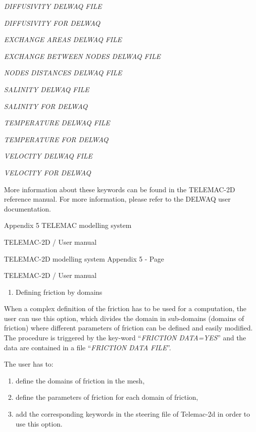  \textit{DIFFUSIVITY DELWAQ FILE}

 \textit{DIFFUSIVITY FOR DELWAQ}

 \textit{EXCHANGE AREAS DELWAQ FILE}

 \textit{EXCHANGE BETWEEN NODES DELWAQ FILE}

 \textit{NODES DISTANCES DELWAQ FILE}

 \textit{SALINITY DELWAQ FILE}

 \textit{SALINITY FOR DELWAQ}

 \textit{TEMPERATURE DELWAQ FILE}

 \textit{TEMPERATURE FOR DELWAQ}

 \textit{VELOCITY DELWAQ FILE}

 \textit{VELOCITY FOR DELWAQ}

 More information about these keywords can be found in the TELEMAC-2D reference manual. For more information, please refer to the DELWAQ user documentation.











 Appendix 5 TELEMAC modelling system

 TELEMAC-2D / User manual



 TELEMAC-2D modelling system Appendix 5 - Page

 TELEMAC-2D / User manual





\begin{enumerate}
\item   Defining friction by domains
\end{enumerate}

 When a complex definition of the friction has to be used for a computation, the user can use this option, which divides the domain in sub-domains (domains of friction) where different parameters of friction can be defined and easily modified. The procedure is triggered by the key-word ``\textit{FRICTION DATA=YES}'' and the data are contained in a file ``\textit{FRICTION DATA FILE}''.

 The user has to:

\begin{enumerate}
\item  define the domains of friction in the mesh,

\item  define the parameters of friction for each domain of friction,

\item  add the corresponding keywords in the steering file of Telemac-2d in order to use this option.
\end{enumerate}

